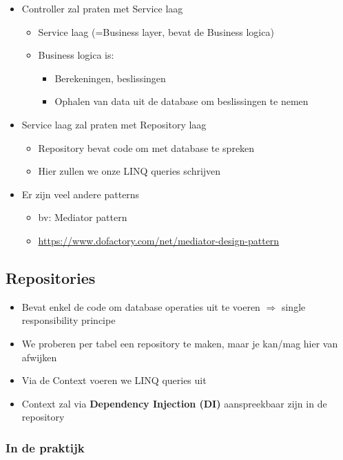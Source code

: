 \documentclass{article}
\begin{document}
\begin{itemize}
    \item Controller zal praten met Service laag
    \begin{itemize}
        \item Service laag (=Business layer, bevat de Business logica)
        \item Business logica is:
        \begin{itemize}
            \item Berekeningen, beslissingen
            \item Ophalen van data uit de database om beslissingen te nemen
        \end{itemize}
    \end{itemize}
    \item Service laag zal praten met Repository laag
    \begin{itemize}
        \item Repository bevat code om met database te spreken
        \item Hier zullen we onze LINQ queries schrijven
    \end{itemize}
    \item Er zijn veel andere patterns
    \begin{itemize}
        \item bv: Mediator pattern 
        \item \url{https://www.dofactory.com/net/mediator-design-pattern}
    \end{itemize}
\end{itemize}

\subsection{Repositories}

\begin{itemize}
    \item Bevat enkel de code om database operaties uit te voeren $\Rightarrow$ single responsibility principe
    \item We proberen per tabel een repository te maken, maar je kan/mag hier van afwijken
    \item Via de Context voeren we LINQ queries uit
    \item Context zal via \textbf{Dependency Injection (DI)} aanspreekbaar zijn in de repository
\end{itemize}

\subsubsection{In de praktijk}
\end{document}
